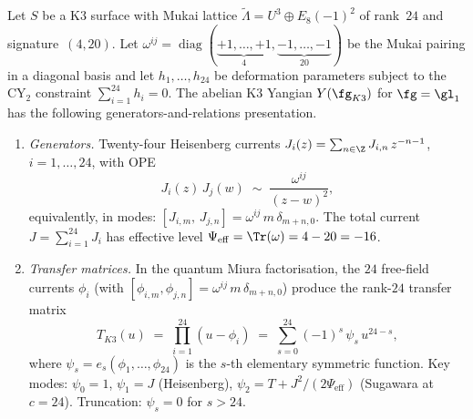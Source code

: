 \begin{theorem}
\label{thm:k3-abelian-yangian-presentation}
\ClaimStatusProvedHere
Let $S$ be a K3 surface with Mukai lattice
$\widetilde{\Lambda} = U^3 \oplus E_8(-1)^2$
of rank~$24$ and signature~$(4,20)$.
Let $\omega^{ij} = \operatorname{diag}(\underbrace{+1,\ldots,+1}_{4},
\underbrace{-1,\ldots,-1}_{20})$ be the Mukai pairing in a
diagonal basis and let $h_1, \ldots, h_{24}$ be deformation parameters
subject to the CY$_2$ constraint $\sum_{i=1}^{24} h_i = 0$.
The abelian K3 Yangian $Y(\fg_{K3})$ for $\fg = \gl_1$ has the
following generators-and-relations presentation.
\begin{enumerate}[label=\textup{(\roman*)}]

\item \emph{Generators.}
Twenty-four Heisenberg currents
$J_i(z) = \sum_{n \in \Z} J_{i,n}\, z^{-n-1}$, $i = 1,\ldots, 24$,
with OPE
\begin{equation}\label{eq:k3-yangian-ope}
  J_i(z)\, J_j(w) \;\sim\; \frac{\omega^{ij}}{(z - w)^2},
\end{equation}
equivalently, in modes:
$[J_{i,m},\, J_{j,n}] = \omega^{ij}\, m\, \delta_{m+n,0}$.
The total current $J = \sum_{i=1}^{24} J_i$ has effective level
$\Psi_{\mathrm{eff}} = \Tr(\omega) = 4 - 20 = -16$.

\item \emph{Transfer matrices.}
In the quantum Miura factorisation, the $24$ free-field currents
$\phi_i$ (with $[\phi_{i,m}, \phi_{j,n}] = \omega^{ij}\, m\,
\delta_{m+n,0}$)
produce the rank-$24$ transfer matrix
\begin{equation}\label{eq:k3-yangian-miura}
  T_{K3}(u) \;=\; \prod_{i=1}^{24} (u - \phi_i)
  \;=\; \sum_{s=0}^{24} (-1)^s\, \psi_s\, u^{24-s},
\end{equation}
where $\psi_s = e_s(\phi_1, \ldots, \phi_{24})$ is the $s$-th
elementary symmetric function.
Key modes: $\psi_0 = 1$, $\psi_1 = J$ (Heisenberg),
$\psi_2 = T + J^2/(2\Psi_{\mathrm{eff}})$ (Sugawara at $c = 24$).
Truncation: $\psi_s = 0$ for $s > 24$.


\end{enumerate}
\end{theorem}
